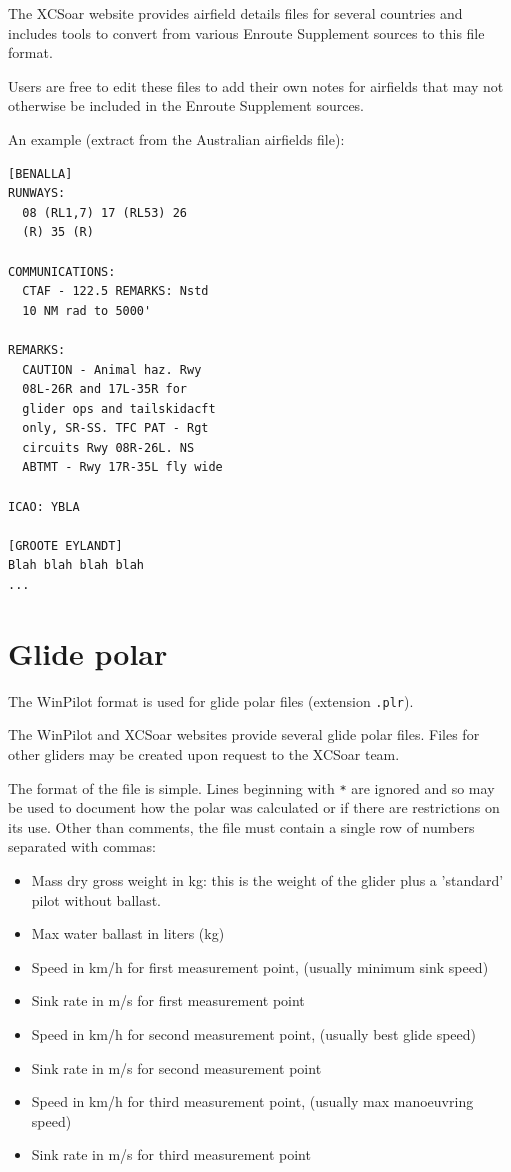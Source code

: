 \documentclass[a4paper,12pt]{refrep}
\begin{document}
The XCSoar website provides airfield details files for several
countries and includes tools to convert from various Enroute
Supplement sources to this file format.

Users are free to edit these files to add their own notes for
airfields that may not otherwise be included in the Enroute Supplement
sources.

An example (extract from the Australian airfields file):
\begin{verbatim}
[BENALLA]
RUNWAYS:
  08 (RL1,7) 17 (RL53) 26
  (R) 35 (R)

COMMUNICATIONS:
  CTAF - 122.5 REMARKS: Nstd
  10 NM rad to 5000'

REMARKS:
  CAUTION - Animal haz. Rwy
  08L-26R and 17L-35R for
  glider ops and tailskidacft
  only, SR-SS. TFC PAT - Rgt
  circuits Rwy 08R-26L. NS
  ABTMT - Rwy 17R-35L fly wide

ICAO: YBLA

[GROOTE EYLANDT]
Blah blah blah blah
...
\end{verbatim}

\section{Glide polar}

The WinPilot format is used for glide polar files (extension \verb|.plr|).

The WinPilot and XCSoar websites provide several glide polar files.
Files for other gliders may be created upon request to the XCSoar
team.

The format of the file is simple.  Lines beginning with \verb|*| are
ignored and so may be used to document how the polar was calculated or
if there are restrictions on its use.  Other than comments, the file
must contain a single row of numbers separated with commas:
\begin{itemize}
\item Mass dry gross weight in kg: this is the weight of the glider plus
  a 'standard' pilot without ballast.
\item Max water ballast in liters (kg)
\item Speed in km/h for first measurement point, (usually minimum sink speed)
\item Sink rate in m/s for first measurement point
\item Speed in km/h for second measurement point, (usually best glide speed)
\item Sink rate in m/s for second measurement point
\item Speed in km/h for third measurement point, (usually max manoeuvring speed)
\item Sink rate in m/s for third measurement point
\end{itemize}
\end{document}
